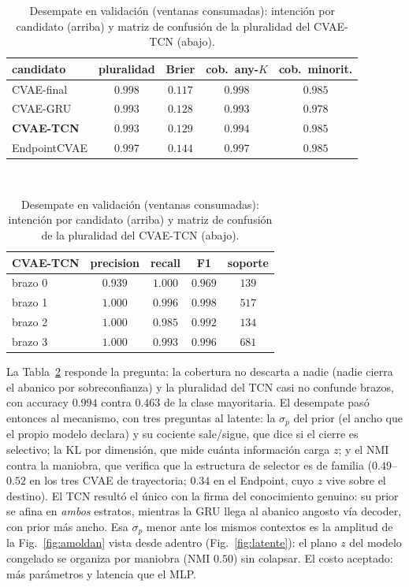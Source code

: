 \documentclass[conference,a4paper]{IEEEtran}
\begin{document}
\begin{table}[H]
\caption{Desempate en validación (ventanas consumadas): intención por
candidato (arriba) y matriz de confusión de la pluralidad del CVAE-TCN
(abajo).}
\label{tab:desempate}
\centering
\footnotesize
\setlength{\tabcolsep}{3.5pt}
\begin{tabular}{@{}l c c c c@{}}
\toprule
candidato & pluralidad & Brier & cob.\ any-$K$ & cob.\ minorit. \\
\midrule
CVAE-final & $0.998$ & $0.117$ & $0.998$ & $0.985$ \\
CVAE-GRU & $0.993$ & $0.128$ & $0.993$ & $0.978$ \\
\textbf{CVAE-TCN} & $0.993$ & $0.129$ & $0.994$ & $0.985$ \\
EndpointCVAE & $0.997$ & $0.144$ & $0.997$ & $0.985$ \\
\bottomrule
\end{tabular}\\[4pt]
\begin{tabular}{@{}l c c c c@{}}
\toprule
CVAE-TCN & precision & recall & F1 & soporte \\
\midrule
brazo 0 & $0.939$ & $1.000$ & $0.969$ & $139$ \\
brazo 1 & $1.000$ & $0.996$ & $0.998$ & $517$ \\
brazo 2 & $1.000$ & $0.985$ & $0.992$ & $134$ \\
brazo 3 & $1.000$ & $0.993$ & $0.996$ & $681$ \\
\bottomrule
\end{tabular}
\end{table}

La Tabla~\ref{tab:desempate} responde la pregunta: la cobertura no
descarta a nadie (nadie cierra el abanico por sobreconfianza) y la
pluralidad del TCN casi no confunde brazos, con accuracy $0.994$ contra
$0.463$ de la clase mayoritaria. El desempate pasó entonces al mecanismo, con tres preguntas al latente: la $\sigma_p$
del prior (el ancho que el propio modelo declara) y su cociente
sale/sigue, que dice si el cierre es selectivo; la KL por dimensión, que
mide cuánta información carga $z$; y el NMI contra la maniobra, que
verifica que la estructura de selector es de familia ($0.49$--$0.52$ en
los tres CVAE de trayectoria; $0.34$ en el Endpoint, cuyo $z$ vive sobre
el destino). El TCN resultó el único con la firma del conocimiento
genuino: su prior se afina en \emph{ambos} estratos, mientras la GRU llega
al abanico angosto vía decoder, con prior más ancho. Esa $\sigma_p$ menor
ante los mismos contextos es la amplitud de la Fig.~\ref{fig:amoldan}
vista desde adentro (Fig.~\ref{fig:latente}): el plano $z$ del modelo
congelado se organiza por maniobra (NMI $0.50$) sin colapsar. El costo
aceptado: más parámetros y latencia que el MLP.
\end{document}

